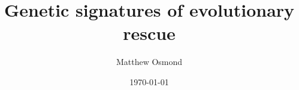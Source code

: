 \documentclass{beamer}
\title{Genetic signatures of evolutionary rescue}
\author{Matthew Osmond}
\institute{Department of Ecology and Evolutionary Biology\\ University of Toronto}
\date{\today}
\begin{document}
\begin{frame}
    \titlepage
\end{frame}



\end{document}
